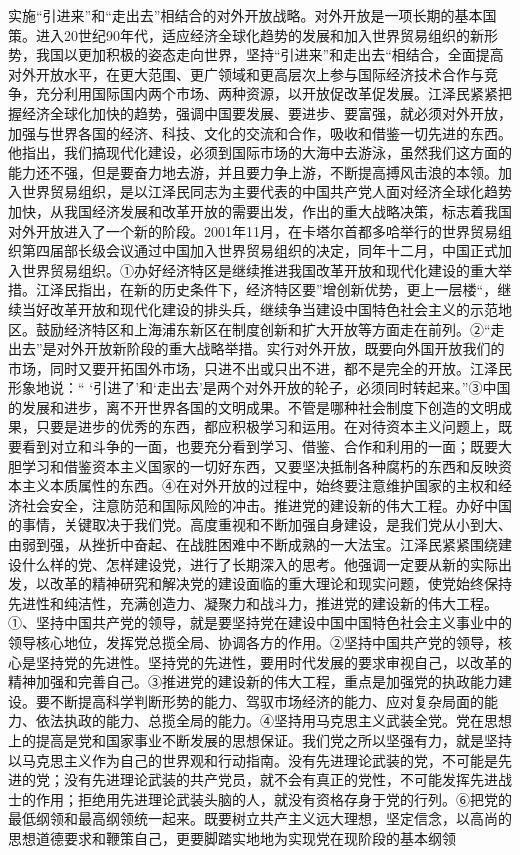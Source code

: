 \documentclass[12pt,UTF8]{ctexart}
\begin{document}
实施“引进来”和“走出去”相结合的对外开放战略。对外开放是一项长期的基本国策。进入20世纪90年代，适应经济全球化趋势的发展和加入世界贸易组织的新形势，我国以更加积极的姿态走向世界，坚持“引进来”和走出去“相结合，全面提高对外开放水平，在更大范围、更广领域和更高层次上参与国际经济技术合作与竞争，充分利用国际国内两个市场、两种资源，以开放促改革促发展。江泽民紧紧把握经济全球化加快的趋势，强调中国要发展、要进步、要富强，就必须对外开放，加强与世界各国的经济、科技、文化的交流和合作，吸收和借鉴一切先进的东西。他指出，我们搞现代化建设，必须到国际市场的大海中去游泳，虽然我们这方面的能力还不强，但是要奋力地去游，并且要力争上游，不断提高搏风击浪的本领。加入世界贸易组织，是以江泽民同志为主要代表的中国共产党人面对经济全球化趋势加快，从我国经济发展和改革开放的需要出发，作出的重大战略决策，标志着我国对外开放进入了一个新的阶段。2001年11月，在卡塔尔首都多哈举行的世界贸易组织第四届部长级会议通过中国加入世界贸易组织的决定，同年十二月，中国正式加入世界贸易组织。①办好经济特区是继续推进我国改革开放和现代化建设的重大举措。江泽民指出，在新的历史条件下，经济特区要”增创新优势，更上一层楼“，继续当好改革开放和现代化建设的排头兵，继续争当建设中国特色社会主义的示范地区。鼓励经济特区和上海浦东新区在制度创新和扩大开放等方面走在前列。②“走出去”是对外开放新阶段的重大战略举措。实行对外开放，既要向外国开放我们的市场，同时又要开拓国外市场，只进不出或只出不进，都不是完全的开放。江泽民形象地说：“ ‘引进了’和‘走出去’是两个对外开放的轮子，必须同时转起来。”③中国的发展和进步，离不开世界各国的文明成果。不管是哪种社会制度下创造的文明成果，只要是进步的优秀的东西，都应积极学习和运用。在对待资本主义问题上，既要看到对立和斗争的一面，也要充分看到学习、借鉴、合作和利用的一面；既要大胆学习和借鉴资本主义国家的一切好东西，又要坚决抵制各种腐朽的东西和反映资本主义本质属性的东西。④在对外开放的过程中，始终要注意维护国家的主权和经济社会安全，注意防范和国际风险的冲击。推进党的建设新的伟大工程。办好中国的事情，关键取决于我们党。高度重视和不断加强自身建设，是我们党从小到大、由弱到强，从挫折中奋起、在战胜困难中不断成熟的一大法宝。江泽民紧紧围绕建设什么样的党、怎样建设党，进行了长期深入的思考。他强调一定要从新的实际出发，以改革的精神研究和解决党的建设面临的重大理论和现实问题，使党始终保持先进性和纯洁性，充满创造力、凝聚力和战斗力，推进党的建设新的伟大工程。①、坚持中国共产党的领导，就是要坚持党在建设中国中国特色社会主义事业中的领导核心地位，发挥党总揽全局、协调各方的作用。②坚持中国共产党的领导，核心是坚持党的先进性。坚持党的先进性，要用时代发展的要求审视自己，以改革的精神加强和完善自己。③推进党的建设新的伟大工程，重点是加强党的执政能力建设。要不断提高科学判断形势的能力、驾驭市场经济的能力、应对复杂局面的能力、依法执政的能力、总揽全局的能力。④坚持用马克思主义武装全党。党在思想上的提高是党和国家事业不断发展的思想保证。我们党之所以坚强有力，就是坚持以马克思主义作为自己的世界观和行动指南。没有先进理论武装的党，不可能是先进的党；没有先进理论武装的共产党员，就不会有真正的党性，不可能发挥先进战士的作用；拒绝用先进理论武装头脑的人，就没有资格存身于党的行列。⑥把党的最低纲领和最高纲领统一起来。既要树立共产主义远大理想，坚定信念，以高尚的思想道德要求和鞭策自己，更要脚踏实地地为实现党在现阶段的基本纲领
\end{document}
